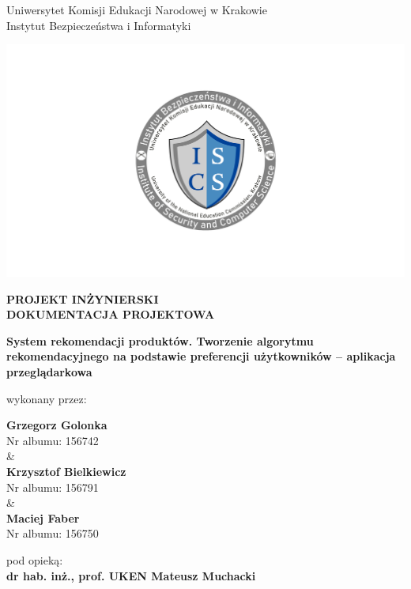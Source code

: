 \documentclass[12pt,a4paper,oneside]{article}
\theoremstyle{definition}
\numberwithin{equation}{section}
\begin{document}
\renewcommand{\thepage}{\arabic{page}}

\thispagestyle{empty} %
\begin{titlepage}
\begin{center}\Large
Uniwersytet Komisji Edukacji Narodowej w Krakowie\\
\large
Instytut Bezpieczeństwa i Informatyki\\
\vskip 10pt
\end{center}
\begin{center}
\centering \includegraphics[width=1.0\columnwidth]{images/logo.png}
\end{center}

\begin{center}
 {\bf \fontsize{14pt}{14pt}\selectfont PROJEKT INŻYNIERSKI \\ DOKUMENTACJA PROJEKTOWA}
\end{center}
\vskip 5pt
\begin{center}
 {\bf \fontsize{15pt}{25pt}\selectfont System rekomendacji produktów. Tworzenie algorytmu rekomendacyjnego na
 podstawie preferencji użytkowników – aplikacja przeglądarkowa}
\end{center}

\begin{center}
 {\fontsize{12pt}{12pt}\selectfont wykonany przez: }
\end{center}
\begin{center}
 {\bf\fontsize{16pt}{16pt}\selectfont Grzegorz Golonka}\\
 {\fontsize{12pt}{12pt}\selectfont Nr albumu:  156742 \\\&\\}
 {\bf\fontsize{16pt}{16pt}\selectfont Krzysztof Bielkiewicz }\\
 {\fontsize{12pt}{12pt}\selectfont Nr albumu: 156791 \\\&\\}
 {\bf\fontsize{16pt}{16pt}\selectfont Maciej Faber }\\
 {\fontsize{12pt}{12pt}\selectfont Nr albumu: 156750 }
\end{center}
\begin{center}
 {\fontsize{12pt}{12pt}\selectfont pod opieką:}\\
 {\bf\fontsize{12pt}{12pt}\selectfont dr hab. inż., prof. UKEN Mateusz Muchacki }
\end{center}


\end{titlepage}
\end{document}

